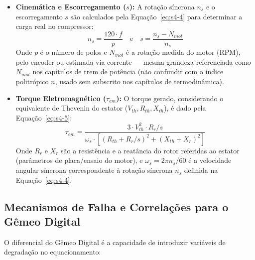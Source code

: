 \documentclass[12pt,a4paper]{article}
\numberwithin{equation}{section}
\numberwithin{table}{section}
\numberwithin{figure}{section}
\begin{document}
{	\begin{itemize}
		\item \textbf{Cinemática e Escorregamento ($s$):}
		A rotação síncrona $n_s$ e o escorregamento $s$ são calculados pela Equação~\eqref{eq:s4-4} para determinar a carga real no compressor:
		\begin{equation}\label{eq:s4-4}
 n_s = \frac{120 \cdot f}{p} \quad \text{e} \quad s = \frac{n_s - N_{mot}}{n_s} 
\end{equation}
		Onde $p$ é o número de polos e $N_{mot}$ é a rotação medida do motor (RPM), pelo encoder ou estimada via corrente — mesma grandeza referenciada como $N_{mot}$ nos capítulos de trem de potência (não confundir com o índice politrópico $n$, usado sem subscrito nos capítulos de termodinâmica).
		\item \textbf{Torque Eletromagnético ($\tau_{em}$):}
		O torque gerado, considerando o equivalente de Thevenin do estator ($V_{th}, R_{th}, X_{th}$), é dado pela Equação~\eqref{eq:s4-5}:
		\begin{equation}\label{eq:s4-5}
 \tau_{em} = \frac{3 \cdot V_{th}^2 \cdot R_r / s}{\omega_s \cdot \left[ (R_{th} + R_r / s)^2 + (X_{th} + X_r)^2 \right]} 
\end{equation}
		Onde $R_r$ e $X_r$ são a resistência e a reatância do rotor referidas ao estator (parâmetros de placa/ensaio do motor), e $\omega_s = 2\pi n_s/60$ é a velocidade angular síncrona correspondente à rotação síncrona $n_s$ definida na Equação~\eqref{eq:s4-4}.
	\end{itemize}
	
	\subsection{\textbf{Mecanismos de Falha e Correlações para o Gêmeo Digital}}
	O diferencial do Gêmeo Digital é a capacidade de introduzir variáveis de degradação no equacionamento:
	
}
\end{document}
